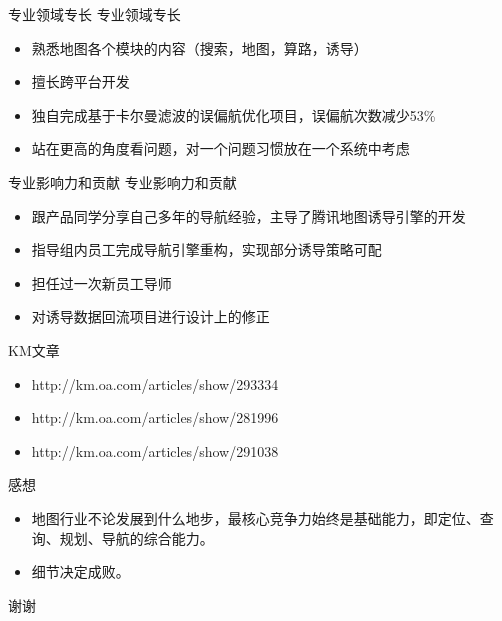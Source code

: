 \documentclass[10pt]{beamer}
\begin{document}
\begin{frame}{专业领域专长}
	\alert{专业领域专长}
	\begin{itemize}
		\item 熟悉地图各个模块的内容（搜索，地图，算路，诱导）
		\item 擅长跨平台开发
		\item 独自完成基于卡尔曼滤波的误偏航优化项目，误偏航次数减少53\%
		\item 站在更高的角度看问题，对一个问题习惯放在一个系统中考虑
	\end{itemize}
\end{frame}

\begin{frame}{专业影响力和贡献}
	\alert{专业影响力和贡献}
	\begin{itemize}
		\item 跟产品同学分享自己多年的导航经验，主导了腾讯地图诱导引擎的开发
		\item 指导组内员工完成导航引擎重构，实现部分诱导策略可配 
		\item 担任过一次新员工导师
		\item 对诱导数据回流项目进行设计上的修正
	\end{itemize}
	\alert{KM文章}
	\begin{itemize}
		\item http://km.oa.com/articles/show/293334
		\item http://km.oa.com/articles/show/281996 
		\item http://km.oa.com/articles/show/291038
	\end{itemize}	
\end{frame}

\begin{frame}{感想}
	\begin{itemize}
		\item 地图行业不论发展到什么地步，最核心竞争力始终是基础能力，即定位、查询、规划、导航的综合能力。
		\item 细节决定成败。
	\end{itemize}
\end{frame}

\begin{frame}{}
	谢谢
\end{frame}
\end{document}

